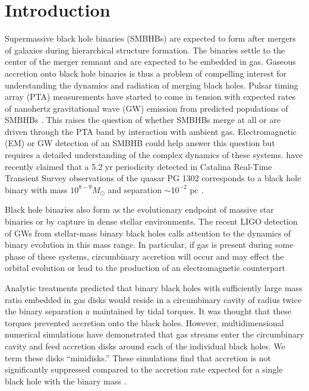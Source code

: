 \section{Introduction} 


Supermassive black hole binaries (SMBHBs) are expected to form after mergers of galaxies during hierarchical structure formation.  The binaries settle to the center of the merger remnant and are expected to be embedded in gas. Gaseous accretion onto black hole binaries is thus a problem of compelling interest for understanding the dynamics and radiation of merging black holes. Pulsar timing array (PTA) measurements have started to come in tension with expected rates of nanohertz gravitational wave (GW) emission from predicted populations of SMBHBs \citep{Shannon15}. This raises the question of whether SMBHBs merge at all or are driven through the PTA band by interaction with ambient gas. Electromagnetic (EM) or GW detection of an SMBHB could help answer this question but requires a detailed understanding of the complex dynamics of these systems. \cite{Graham15A} have recently claimed that a 5.2 yr periodicity detected in Catalina Real-Time Transient Survey observations of the quasar PG 1302 corresponds to a black hole binary with mass $10^{8-9}M_{\odot}$ and separation $\sim 10^{-2}$ pc \citep[see also][]{Graham15B}. 

Black hole binaries also form as the evolutionary endpoint of massive star binaries or by capture in dense stellar environments. The recent LIGO detection of GWs from stellar-mass binary black holes calls attention to the dynamics of binary evolution in this mass range. In particular, if gas is present during some phase of these systems, circumbinary accretion will occur and may effect the orbital evolution or lead to the production of an electromagnetic counterpart \citep{Bartos16, Perna16}

Analytic treatments \citep{Artymowicz94,Milos05,Shapiro10} predicted that binary black holes with sufficiently large mass ratio embedded in gas disks would reside in a circumbinary cavity of radius twice the binary separation $a$ maintained by tidal torques. It was thought that these torques prevented accretion onto the black holes. However, multidimensional numerical simulations \citep{MacFadyen08, Noble12, Farris12, DOrazio12,Gold14, Farris14, Farris15A, Farris15B,Shi15, Bankert15,Schnittman15,delValle15,Young15,DOrazio16, Munoz16,Miranda16} have demonstrated that gas streams enter the circumbinary cavity and feed accretion disks around each of the individual black holes. We term these disks ``minidisks.'' These simulations find that accretion is not significantly suppressed compared to the accretion rate expected for a single black hole with the binary mass \citep{Farris14,Shi15}.

